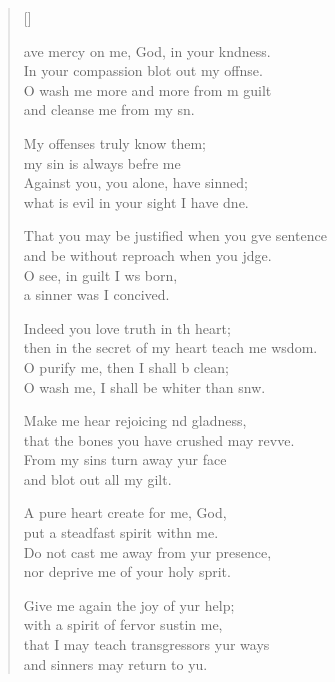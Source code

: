 \settowidth{\versewidth}{That you may be justified when you give sentence *}
\begin{verse}[\versewidth]
  \begin{patverse}
    ave mercy on me, God, in your k\pointup{\i}ndness.\Med\\
In your compassion blot out my offnse.\\
O wash me more and more from m guilt\Med\\
and cleanse me from my s\pointup{\i}n.

My offenses truly  know them;\Med\\
my sin is always befre me\\
Against you, you alone, have  sinned;\Med\\
what is evil in your sight I have dne.

That you may be justified when you g\pointup{\i}ve sentence\Med\\
and be without reproach when you jdge.\\
O see, in guilt I ws born,\Med\\
a sinner was I concived.

Indeed you love truth in th heart;\Med\\
then in the secret of my heart teach me w\pointup{\i}sdom.\\
O purify me, then I shall b clean;\Med\\
O wash me, I shall be whiter than snw.

Make me hear rejoicing nd gladness,\Med\\
that the bones you have crushed may rev\pointup{\i}ve.\\
From my sins turn away yur face\Med\\
and blot out all my gilt.

A pure heart create for me,  God,\Med\\
put a steadfast spirit with\pointup{\i}n me.\\
Do not cast me away from yur presence,\Med\\
nor deprive me of your holy sp\pointup{\i}rit.

Give me again the joy of yur help;\Med\\
with a spirit of fervor sustin me,\\
that I may teach transgressors yur ways\Med\\
and sinners may return to yu.


\end{patverse}
\end{verse}
